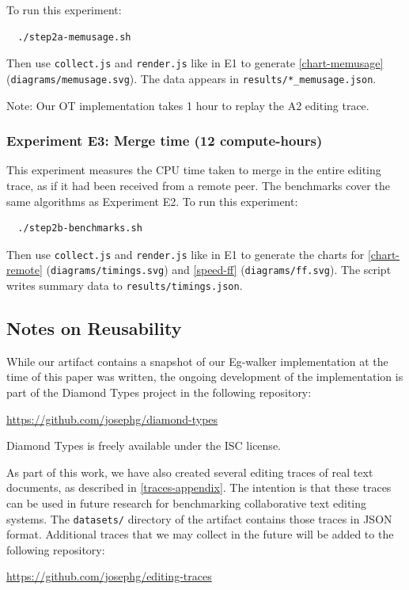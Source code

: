 \documentclass[sigplan,10pt]{acmart}
\begin{document}
To run this experiment:
\begin{verbatim}
  ./step2a-memusage.sh
\end{verbatim}
Then use \verb|collect.js| and \verb|render.js| like in E1 to generate \autoref{chart-memusage} (\verb|diagrams/memusage.svg|).
The data appears in \verb|results/*_memusage.json|.

Note: Our OT implementation takes 1 hour to replay the A2 editing trace.

\subsubsection{Experiment E3: Merge time (12 compute-hours)}

This experiment measures the CPU time taken to merge in the entire editing trace, as if it had been received from a remote peer.
The benchmarks cover the same algorithms as Experiment E2.
To run this experiment:
\begin{verbatim}
  ./step2b-benchmarks.sh
\end{verbatim}
Then use \verb|collect.js| and \verb|render.js| like in E1 to generate the charts for \autoref{chart-remote} (\verb|diagrams/timings.svg|) and \autoref{speed-ff} (\verb|diagrams/ff.svg|).
The script writes summary data to \verb|results/timings.json|.

\subsection{Notes on Reusability}

While our artifact contains a snapshot of our Eg-walker implementation at the time of this paper was written, the ongoing development of the implementation is part of the Diamond Types project in the following repository:

\url{https://github.com/josephg/diamond-types}

Diamond Types is freely available under the ISC license.

As part of this work, we have also created several editing traces of real text documents, as described in \autoref{traces-appendix}.
The intention is that these traces can be used in future research for benchmarking collaborative text editing systems.
The \verb|datasets/| directory of the artifact contains those traces in JSON format.
Additional traces that we may collect in the future will be added to the following repository:

\url{https://github.com/josephg/editing-traces}
\end{document}
